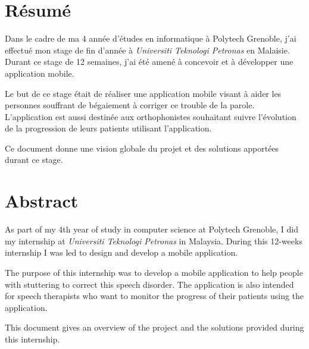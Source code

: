 \chapter*{Résumé}
Dans le cadre de ma 4 année d'études en informatique à Polytech Grenoble, j'ai effectué mon stage de fin d'année à \textit{Universiti Teknologi Petronas} en Malaisie. Durant ce stage de 12 semaines, j'ai été amené à concevoir et à développer une application mobile.

Le but de ce stage était de réaliser une application mobile visant à aider les personnes souffrant de bégaiement à corriger ce trouble de la parole. L'application est aussi destinée aux orthophonistes souhaitant suivre l'évolution de la progression de leurs patients utilisant l'application.

Ce document donne une vision globale du projet et des solutions apportées durant ce stage.

\vspace{4cm}

\begingroup
\let\clearpage\relax
\chapter*{Abstract}
\endgroup

As part of my 4th year of study in computer science at Polytech Grenoble, I did my internship at \textit{Universiti Teknologi Petronas} in Malaysia. During this 12-weeks internship I was led to design and develop a mobile application.

The purpose of this internship was to develop a mobile application to help people with stuttering to correct this speech disorder. The application is also intended for speech therapists who want to monitor the progress of their patients using the application.

This document gives an overview of the project and the solutions provided during this internship.
